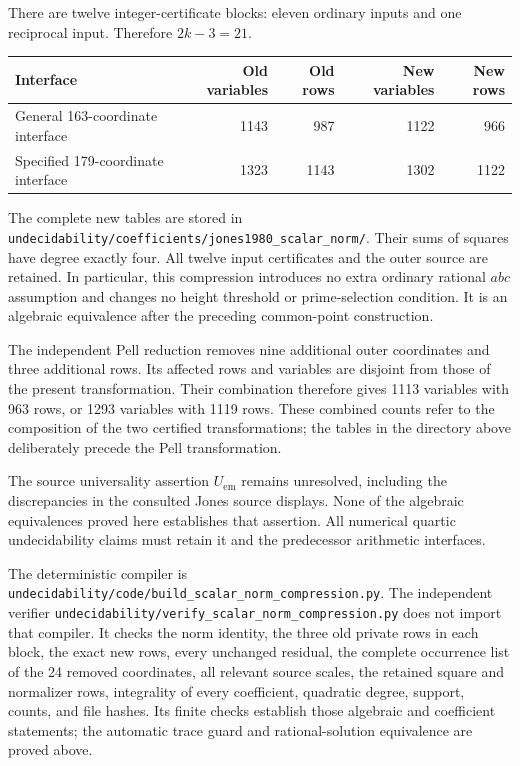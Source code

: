 \documentclass[11pt]{article}
\begin{document}
There are twelve integer-certificate blocks: eleven ordinary inputs
and one reciprocal input. Therefore \(2k-3=21\).
\begin{center}
\begin{tabular}{@{}lrrrr@{}}
\toprule
Interface & Old variables & Old rows & New variables & New rows\\
\midrule
General 163-coordinate interface &1143&987&1122&966\\
Specified 179-coordinate interface&1323&1143&1302&1122\\
\bottomrule
\end{tabular}
\end{center}
The complete new tables are stored in
\nolinkurl{undecidability/coefficients/jones1980_scalar_norm/}.
Their sums of squares have degree exactly four. All twelve input
certificates and the outer source are retained. In particular,
this compression introduces no extra ordinary rational \(abc\)
assumption and changes no height threshold or prime-selection
condition. It is an algebraic equivalence after the preceding
common-point construction.

The independent Pell reduction \cite{pell} removes nine additional
outer coordinates and three additional rows. Its affected rows and
variables are disjoint from those of the present transformation.
Their combination therefore gives 1113 variables with 963 rows,
or 1293 variables with 1119 rows. These combined counts refer to
the composition of the two certified transformations; the tables
in the directory above deliberately precede the Pell transformation.

The source universality assertion \(U_{\mathrm{em}}\) remains
unresolved, including the discrepancies in the consulted Jones
source displays. None of the algebraic equivalences proved here
establishes that assertion. All numerical quartic undecidability
claims must retain it and the predecessor arithmetic interfaces.

The deterministic compiler is
\nolinkurl{undecidability/code/build_scalar_norm_compression.py}.
The independent verifier
\nolinkurl{undecidability/verify_scalar_norm_compression.py}
does not import that compiler. It checks the norm identity, the
three old private rows in each block, the exact new rows, every
unchanged residual, the complete occurrence list of the 24
removed coordinates, all relevant source scales, the retained
square and normalizer rows, integrality of every coefficient,
quadratic degree, support, counts, and file hashes. Its finite
checks establish those algebraic and coefficient statements;
the automatic trace guard and rational-solution equivalence are
proved above.
\end{document}
